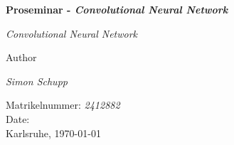\begin{titlepage}
\begin{center}
	\vspace{3em}	
    {\Huge\bfseries Proseminar - \textit{Convolutional Neural Network}\par}
    \vspace{2em}
    {\huge \textit{Convolutional Neural Network} \par}
    \vspace{3em}
    Author\\
	\vspace{1em}
    {\Large \textit{Simon Schupp}\par}
    \vspace{1em}
    Matrikelnummer: \textit{2412882}\\
    \vspace{3em}
    Date:\\
	\vspace{1em}
    Karlsruhe, \today
\end{center}
\end{titlepage}